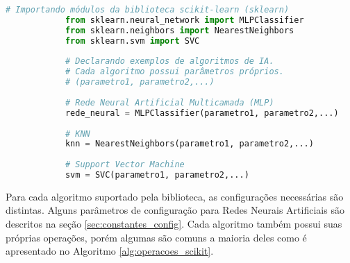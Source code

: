 \documentclass[12pt,oneside,a4paper,chapter=TITLE,section=TITLE,sumario
		=tradicional]{abntex2}
\begin{document}
		\begin{algoritmo}[H]
			\begin{lstlisting}[language=Python, literate={{â}{{\^a}}1{á}{{\'a}}1{à}{{\`a}}1{ã}{{\~a}}1{é}{{\'e}}1{ê}{{\^e}}1{í}{{\'i}}1{ó}{{\'o}}1{õ}{{\~o}}1{ú}{{\'u}}1{ü}{{\"u}}1{ç}{{\c{c}}}1}]
			# Importando módulos da biblioteca scikit-learn (sklearn)
			from sklearn.neural_network import MLPClassifier		
			from sklearn.neighbors import NearestNeighbors
			from sklearn.svm import SVC
			
			# Declarando exemplos de algoritmos de IA. 
			# Cada algoritmo possui parâmetros próprios.
			# (parametro1, parametro2,...)
			
			# Rede Neural Artificial Multicamada (MLP)
			rede_neural = MLPClassifier(parametro1, parametro2,...)
			
			# KNN
			knn = NearestNeighbors(parametro1, parametro2,...)
			
			# Support Vector Machine
			svm = SVC(parametro1, parametro2,...)\end{lstlisting}
		\end{algoritmo}
		
		Para cada algoritmo suportado pela biblioteca, as configurações necessárias são distintas. Alguns parâmetros de configuração para Redes Neurais Artificiais são descritos na seção \ref{sec:constantes_config}. Cada algoritmo também possui suas próprias operações, porém algumas são comuns a maioria deles como é apresentado no Algoritmo \ref{alg:operacoes_scikit}.
		
\end{document}
